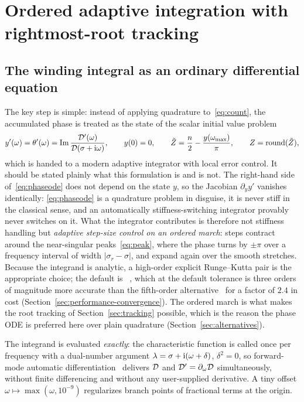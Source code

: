 \section{Ordered adaptive integration with rightmost-root tracking}\label{sec:method}

\subsection{The winding integral as an ordinary differential equation}\label{sec:phaseode}

The key step is simple: instead of applying quadrature
to~\eqref{eq:count}, the accumulated phase is treated as the state of the
scalar initial value problem
\begin{equation}\label{eq:phaseode}
  y'(\omega) = \theta'(\omega)
             = \operatorname{Im}\frac{\mathcal{D}'(\omega)}{\mathcal{D}(\sigma+\mathrm{i}\omega)},
  \qquad y(0)=0,
  \qquad
  \tilde{Z} = \frac{n}{2}-\frac{y(\omega_{\mathrm{max}})}{\pi},
  \qquad
  Z = \operatorname{round}(\tilde{Z}),
\end{equation}
which is handed to a modern adaptive integrator with local error control.
It should be stated plainly what this formulation is and is not. The
right-hand side of~\eqref{eq:phaseode} does not depend on the state $y$, so
the Jacobian $\partial_y y'$ vanishes identically: \eqref{eq:phaseode} is a
quadrature problem in disguise, it is never stiff in the classical sense,
and an automatically stiffness-switching integrator provably never switches
on it. What the integrator contributes is therefore not stiffness handling
but \emph{adaptive step-size control on an ordered march}: steps contract
around the near-singular peaks~\eqref{eq:peak}, where the phase turns by
$\pm\pi$ over a frequency interval of width $|\sigma_r-\sigma|$, and expand
again over the smooth stretches. Because the integrand is analytic, a
high-order explicit Runge--Kutta pair is the appropriate choice; the default
is ~\cite{verner2010numerically}, which at the default tolerance
is three orders of magnitude more accurate than the fifth-order
alternative~\cite{tsitouras2011runge} for a factor of $2.4$ in cost
(Section~\ref{sec:performance-convergence}). The ordered march is
what makes the root tracking of Section~\ref{sec:tracking} possible, which
is the reason the phase ODE is preferred here over plain quadrature
(Section~\ref{sec:alternatives}).

The integrand is evaluated \emph{exactly}: the characteristic function is called
once per frequency with a dual-number argument
$\lambda = \sigma + \mathrm{i}(\omega+\delta)$, $\delta^2=0$, so
forward-mode automatic differentiation~\cite{revels2016forward} delivers
$\mathcal{D}$ and $\mathcal{D}'=\partial_\omega\mathcal{D}$ simultaneously, without finite
differencing and without any user-supplied derivative. A tiny offset
$\omega\mapsto\max(\omega,10^{-9})$ regularizes branch points of fractional
terms at the origin.

